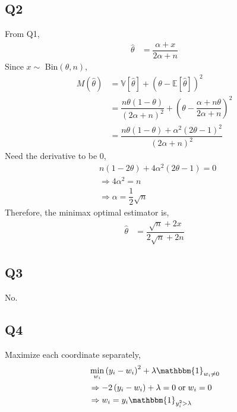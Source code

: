 \documentclass{article}
\begin{document}
\subsection{Q2}
From Q1,
\begin{align*}
\hat{\theta} &= \dfrac{\alpha + x}{2 \alpha + n}
\end{align*}
Since $x  \sim $ Bin$\left(\theta, n \right)$,
\begin{align*}
M\left(\hat{\theta}\right)  &= \mathbb{V}\left[\hat{\theta}\right] + \left(\theta - \mathbb{E}\left[\hat{\theta}\right]\right)^{2}
\\ &= \dfrac{n \theta \left(1 - \theta\right)}{\left(2 \alpha + n\right)^{2}} + \left(\theta - \dfrac{\alpha + n \theta}{2 \alpha + n}\right)^{2}
\\ &= \dfrac{n \theta \left(1 - \theta\right) + \alpha^{2} \left(2 \theta - 1\right)^{2}}{\left(2 \alpha + n\right)^{2}}
\end{align*}
Need the derivative to be $0$,
\begin{align*}
&  n  \left(1 - 2 \theta\right) + 4 \alpha^{2} \left(2 \theta - 1\right) = 0
\\ &\Rightarrow  4 \alpha^{2} = n 
\\ &\Rightarrow  \alpha = \dfrac{1}{2} \sqrt{n}
\end{align*}
Therefore, the minimax optimal estimator is,
\begin{align*}
\hat{\theta} &= \dfrac{\sqrt{n} + 2 x}{2 \sqrt{n} + 2 n}
\end{align*}


\subsection{Q3}
No.



\subsection{Q4}
Maximize each coordinate separately,
\begin{align*}
&  \displaystyle\min_{w_{i}} \left(y_{i} - w_{i}\right)^{2} + \lambda \mathbbm{1}_{w_{i} \neq  0}
\\ &\Rightarrow  - 2 \left(y_{i} - w_{i}\right) + \lambda = 0 \text{\;or\;} w_{i} = 0
\\ &\Rightarrow  w_{i} = y_{i} \mathbbm{1}_{y_{i}^{2} > \lambda}
\end{align*}
\end{document}
